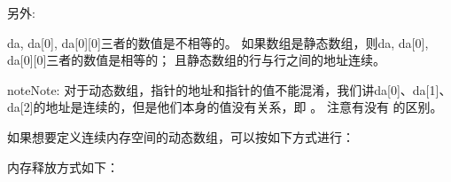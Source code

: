 \documentclass[letterpaper,10pt,english]{sphinxmanual}
\begin{document}
另外:

%
\begin{sphinxVerbatim}[commandchars=\\\{\}]
\PYGZam{}da, \PYGZam{}da[0], \PYGZam{}da[0][0]三者的数值是不相等的。
如果数组是静态数组，则\PYGZam{}da, \PYGZam{}da[0], \PYGZam{}da[0][0]三者的数值是相等的；
且静态数组的行与行之间的地址连续。
\end{sphinxVerbatim}

\begin{sphinxadmonition}{note}{Note:}
对于动态数组，指针的地址和指针的值不能混淆，我们讲da{[}0{]}、da{[}1{]}、da{[}2{]}的地址是连续的，但是他们本身的值没有关系，即  。
注意有没有 \sphinxcode{\sphinxupquote{\&}} 的区别。
\end{sphinxadmonition}

如果想要定义连续内存空间的动态数组，可以按如下方式进行：

%
\begin{sphinxVerbatim}[commandchars=\\\{\},numbers=left,firstnumber=1,stepnumber=1]
 
        
       \PYG{p}{[}\PYG{p}{]}
    \PYG{p}{[}\PYG{p}{]}   \PYG{p}{[}  \PYG{p}{]}
           
        \PYG{p}{[}\PYG{p}{]}  \PYG{p}{[}\PYG{p}{]}    
\end{sphinxVerbatim}

内存释放方式如下：
\end{document}

